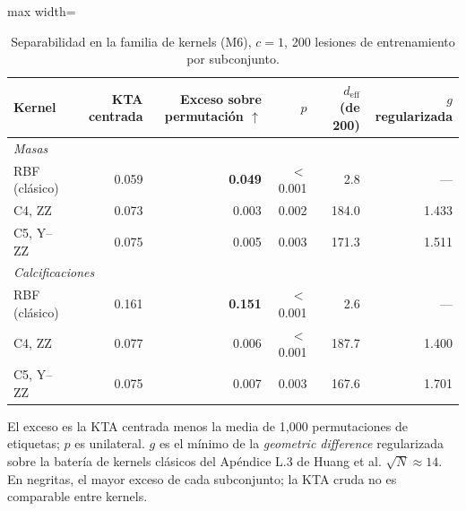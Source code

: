 \begin{table}[H]
\centering
\small
\caption{Separabilidad en la familia de kernels (M6), $c = 1$, 200 lesiones de entrenamiento por subconjunto.}
\label{tab:m6_kernels}
\begin{adjustbox}{max width=\linewidth}
\begin{tabular}{l r r r r r}
\toprule
Kernel & KTA centrada & Exceso sobre permutación $\uparrow$ & $p$ & $d_{\mathrm{eff}}$ (de 200) & $g$ regularizada \\
\midrule
\multicolumn{6}{l}{\textit{Masas}} \\
\quad RBF (clásico) & 0.059 & \textbf{0.049} & $<$0.001 & 2.8 & — \\
\quad C4, ZZ & 0.073 & 0.003 & 0.002 & 184.0 & 1.433 \\
\quad C5, Y--ZZ & 0.075 & 0.005 & 0.003 & 171.3 & 1.511 \\
\multicolumn{6}{l}{\textit{Calcificaciones}} \\
\quad RBF (clásico) & 0.161 & \textbf{0.151} & $<$0.001 & 2.6 & — \\
\quad C4, ZZ & 0.077 & 0.006 & $<$0.001 & 187.7 & 1.400 \\
\quad C5, Y--ZZ & 0.075 & 0.007 & 0.003 & 167.6 & 1.701 \\
\bottomrule
\end{tabular}
\end{adjustbox}
\par\smallskip
\parbox{0.95\linewidth}{\footnotesize El exceso es la KTA centrada menos la media de 1{,}000 permutaciones de etiquetas; $p$ es unilateral. $g$ es el mínimo de la \textit{geometric difference} regularizada sobre la batería de kernels clásicos del Apéndice L.3 de Huang et al.\; $\sqrt{N} \approx 14$. En negritas, el mayor exceso de cada subconjunto; la KTA cruda no es comparable entre kernels.}
\end{table}
